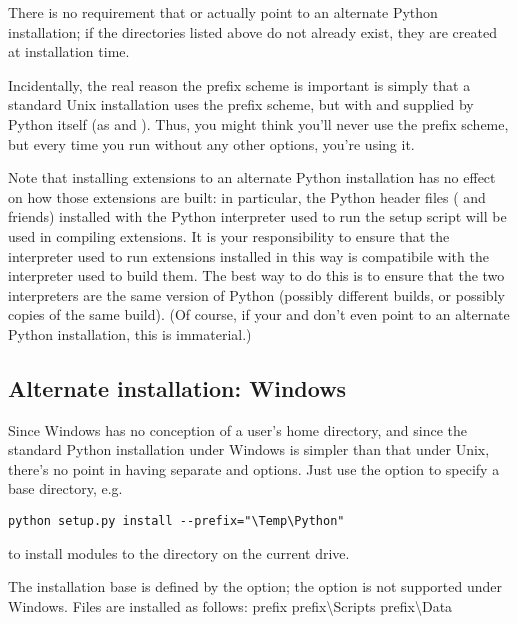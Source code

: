 \documentclass{howto}
\begin{document}
There is no requirement that  or
 actually point to an alternate Python
installation; if the directories listed above do not already exist, they
are created at installation time.

Incidentally, the real reason the prefix scheme is important is simply
that a standard Unix installation uses the prefix scheme, but with
 and  supplied by
Python itself (as  and ).  Thus,
you might think you'll never use the prefix scheme, but every time you
run  without any other options, you're
using it.

Note that installing extensions to an alternate Python installation has
no effect on how those extensions are built: in particular, the Python
header files ( and friends) installed with the Python
interpreter used to run the setup script will be used in compiling
extensions.  It is your responsibility to ensure that the interpreter
used to run extensions installed in this way is compatibile with the
interpreter used to build them.  The best way to do this is to ensure
that the two interpreters are the same version of Python (possibly
different builds, or possibly copies of the same build).  (Of course, if
your  and  don't even
point to an alternate Python installation, this is immaterial.)


\subsection{Alternate installation: Windows}
\label{alt-windows}

Since Windows has no conception of a user's home directory, and since
the standard Python installation under Windows is simpler than that
under Unix, there's no point in having separate 
and  options.  Just use the 
option to specify a base directory, e.g.
\begin{verbatim}
python setup.py install --prefix="\Temp\Python"
\end{verbatim}
to install modules to the  directory on the current
drive.

The installation base is defined by the  option;
the  option is not supported under Windows.
Files are installed as follows:
              {prefix}{}
              {prefix}{\textbackslash{}Scripts}
              {prefix}{\textbackslash{}Data}
\end{document}
